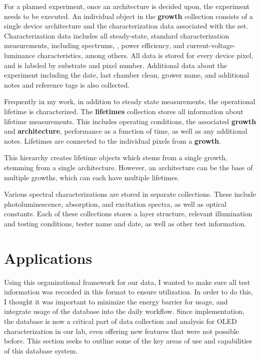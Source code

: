 \documentclass[../thesis.tex]{subfiles}
\begin{document}
For a planned experiment, once an architecture is decided upon, the experiment needs to be executed.
An individual object in the \textbf{growth} collection consists of a single device architecture and the characterization data associated with the set.
Characterization data includes all steady-state, standard characterization measurements, including spectrums, \eqe, power efficiency,  and current-voltage-luminance characteristics, among others.
All data is stored for every device pixel, and is labeled by substrate and pixel number.
Additional data about the experiment including the date, last chamber clean, grower name, and additional notes and reference tags is also collected.

Frequently in my work, in addition to steady state measurements, the operational lifetime is characterized.
The \textbf{lifetimes} collection stores all information about lifetime measurements.
This includes operating conditions, the associated \textbf{growth} and \textbf{architecture}, performance as a function of time, as well as any additional notes.
Lifetimes are connected to the individual pixels from a \textbf{growth}.

This hierarchy creates lifetime objects which stems from a single growth, stemming from a single architecture.  
However, an architecture can be the base of multiple growths, which can each have multiple lifetimes.  

Various spectral characterizations are stored in separate collections.  These include photoluminescence, absorption, and excitation spectra, as well as optical constants.
Each of these collections stores a layer structure, relevant illumination and testing conditions, tester name and date, as well as other test information.

\section{Applications}

Using this organizational framework for our data, I wanted to make sure all test information was recorded in this format to ensure utilization.
In order to do this, I thought it was important to minimize the energy barrier for usage, and integrate usage of the database into the daily workflow.
Since implementation, the database is now a critical part of data collection and analysis for OLED characterization in our lab, even offering new features that were not possible before.
This section seeks to outline some of the key areas of use and capabilities of this database system.
\end{document}
